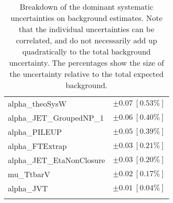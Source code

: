 \begin{table}
\begin{center}
\begin{tabular*}{\textwidth}{@{\extracolsep{\fill}}lc}
alpha\_theoSysW         & $\pm 0.07\ [0.53\%] $       \\
alpha\_JET\_GroupedNP\_1         & $\pm 0.06\ [0.40\%] $       \\
alpha\_PILEUP         & $\pm 0.05\ [0.39\%] $       \\
alpha\_FTExtrap         & $\pm 0.03\ [0.21\%] $       \\
alpha\_JET\_EtaNonClosure         & $\pm 0.03\ [0.20\%] $       \\
mu\_TtbarV         & $\pm 0.02\ [0.17\%] $       \\
alpha\_JVT         & $\pm 0.01\ [0.04\%] $       \\
\noalign{\smallskip}\hline\noalign{\smallskip}
\end{tabular*}
\end{center}
\caption[Breakdown of uncertainty on background estimates]{
Breakdown of the dominant systematic uncertainties on background estimates.
Note that the individual uncertainties can be correlated, and do not necessarily add up quadratically to 
the total background uncertainty. The percentages show the size of the uncertainty relative to the total expected background.
\label{table.results.bkgestimate.uncertainties.SRC1}}
\end{table}
%